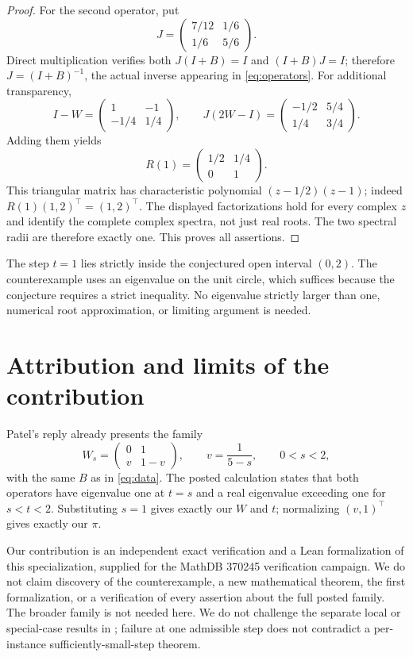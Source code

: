\documentclass[11pt]{article}
\begin{document}
\begin{proof}
For the second operator, put
\[
 J=\begin{pmatrix}7/12&1/6\\1/6&5/6\end{pmatrix}.
\]
Direct multiplication verifies both $J(I+B)=I$ and $(I+B)J=I$;
therefore $J=(I+B)^{-1}$, the actual inverse appearing in
\eqref{eq:operators}. For additional transparency,
\[
 I-W=\begin{pmatrix}1&-1\\-1/4&1/4\end{pmatrix},\qquad
 J(2W-I)=\begin{pmatrix}-1/2&5/4\\1/4&3/4\end{pmatrix}.
\]
Adding them yields
\begin{equation}\label{eq:R}
 R(1)=\begin{pmatrix}1/2&1/4\\0&1\end{pmatrix}.
\end{equation}
This triangular matrix has characteristic polynomial $(z-1/2)(z-1)$;
indeed $R(1)(1,2)^\top=(1,2)^\top$.
The displayed factorizations hold for every complex $z$ and identify the
complete complex spectra, not just real roots. The two spectral radii are
therefore exactly one. This proves all assertions.
\end{proof}

The step $t=1$ lies strictly inside the conjectured open interval $(0,2)$.
The counterexample uses an eigenvalue on the unit circle, which suffices
because the conjecture requires a strict inequality. No eigenvalue
strictly larger than one, numerical root approximation, or limiting
argument is needed.

\section{Attribution and limits of the contribution}
Patel's reply \cite{Patel} already presents the family
\[
 W_s=\begin{pmatrix}0&1\\v&1-v\end{pmatrix},\qquad
 v=\frac1{5-s},\qquad 0<s<2,
\]
with the same $B$ as in \eqref{eq:data}. The posted calculation states that
both operators have eigenvalue one at $t=s$ and a real eigenvalue exceeding
one for $s<t<2$. Substituting $s=1$ gives exactly our $W$ and $t$; normalizing
$(v,1)^\top$ gives exactly our $\pi$.

Our contribution is an independent exact verification and a Lean
formalization of this specialization, supplied for the MathDB 370245
verification campaign. We do not claim discovery of the counterexample,
a new mathematical theorem, the first formalization, or a verification of
every assertion about the full posted family. The broader family is not
needed here. We do not challenge the separate local or special-case
results in \cite{BC}; failure at one admissible step does not contradict a
per-instance sufficiently-small-step theorem.
\end{document}
